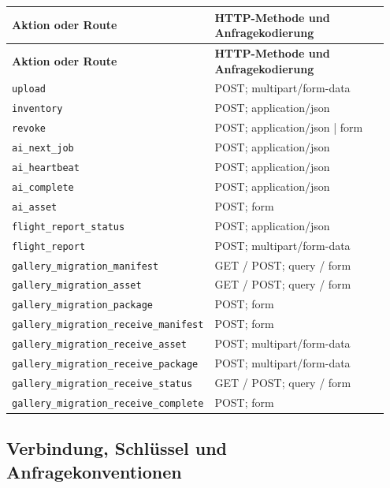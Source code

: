 \documentclass[11pt,a4paper]{article}
\newcommand{\codeword}[1]{\nolinkurl{#1}}
\begin{document}
\begin{longtable}{@{}>{\RaggedRight\arraybackslash}p{0.28\linewidth}>{\RaggedRight\arraybackslash}p{0.67\linewidth}@{}}
\toprule
\textbf{Aktion oder Route} & \textbf{HTTP-Methode und Anfragekodierung} \\
\midrule
\endfirsthead
\toprule
\textbf{Aktion oder Route} & \textbf{HTTP-Methode und Anfragekodierung} \\
\midrule
\endhead
\bottomrule
\endfoot
\codeword{upload} & POST; multipart/form-data \\
\codeword{inventory} & POST; application/json \\
\codeword{revoke} & POST; application/json | form \\
\codeword{ai_next_job} & POST; application/json \\
\codeword{ai_heartbeat} & POST; application/json \\
\codeword{ai_complete} & POST; application/json \\
\codeword{ai_asset} & POST; form \\
\codeword{flight_report_status} & POST; application/json \\
\codeword{flight_report} & POST; multipart/form-data \\
\codeword{gallery_migration_manifest} & GET / POST; query / form \\
\codeword{gallery_migration_asset} & GET / POST; query / form \\
\codeword{gallery_migration_package} & POST; form \\
\codeword{gallery_migration_receive_manifest} & POST; form \\
\codeword{gallery_migration_receive_asset} & POST; multipart/form-data \\
\codeword{gallery_migration_receive_package} & POST; multipart/form-data \\
\codeword{gallery_migration_receive_status} & GET / POST; query / form \\
\codeword{gallery_migration_receive_complete} & POST; form \\
\end{longtable}

\subsection{\texorpdfstring{Verbindung, Schlüssel und Anfragekonventionen}{Verbindung, Schlüssel und Anfragekonventionen}}

\label{api352:connection}
\end{document}
